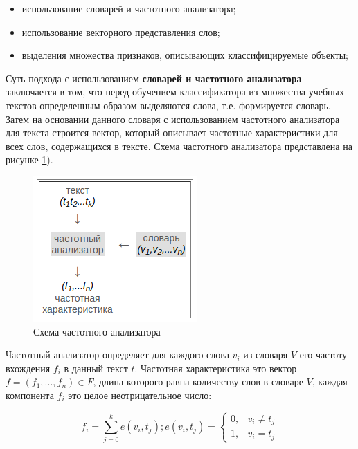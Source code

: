  \begin{itemize}
 	\item использование словарей и частотного анализатора;
 	\item использование векторного представления слов;
 	\item выделения множества признаков, описывающих классифицируемые объекты;
 \end{itemize}

Суть подхода с использованием \textbf{словарей и частотного анализатора} заключается в том, что перед обучением классификатора из множества учебных текстов определенным образом выделяются слова, т.е. формируется словарь. Затем на основании данного словаря с использованием частотного анализатора для текста строится вектор, который описывает частотные характеристики для всех слов, содержащихся в тексте. Схема частотного анализатора представлена на рисунке \ref{anal:freq-anal}).

\begin{figure}[h!]
	\centering
	\includegraphics[scale=0.8]{inc/img/freq-analis.png}
	\caption{Схема частотного анализатора}
	\label{anal:freq-anal}
\end{figure}

Частотный анализатор определяет для каждого слова $v_i$ из словаря $V$ его частоту вхождения $f_i$ в данный текст $t$. Частотная характеристика это вектор $f=(f_1,...,f_n)\in F$, длина которого равна количеству слов в словаре $V$, каждая компонента $f_i$ это целое неотрицательное число:

\begin{equation}
f_i = \sum_{j=0}^{k} e(v_i, t_j); e(v_i, t_j)= \left\{ \begin{array}{ll}
0, & v_i \neq t_j\\
1, & v_i=t_j
\end{array} \right.
\end{equation}
\vspace{\baselineskip}

